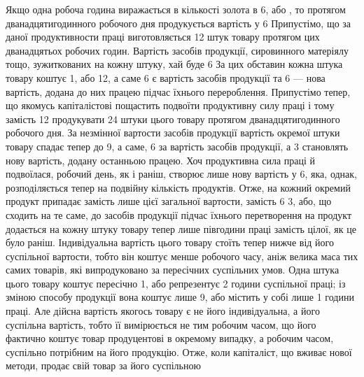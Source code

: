 Якщо одна робоча година виражається в кількості золота
в 6, або , то протягом дванадцятигодинного
робочого дня продукується вартість у 6 Припустімо, що
за даної продуктивности праці виготовляється 12 штук товару
протягом цих дванадцятьох робочих годин. Вартість засобів продукції,
сировинного матеріялу тощо, зужиткованих на кожну
штуку, хай буде 6 За цих обставин кожна штука товару
коштує 1, або 12, а саме 6 є вартість засобів
продукції та 6 — нова вартість, додана до них працею
підчас їхнього перероблення. Припустімо тепер, що якомусь
капіталістові пощастить подвоїти продуктивну силу праці і тому
замість 12 продукувати 24 штуки цього товару протягом дванадцятигодинного
робочого дня. За незмінної вартости засобів
продукції вартість окремої штуки товару спадає тепер до 9,
 а саме, 6 за вартість засобів продукції, а 3 становлять
нову вартість, додану останньою працею. Хоч продуктивна
сила праці й подвоїлася, робочий день, як і раніш, створює
лише нову вартість у 6, яка, однак, розподіляється
тепер на подвійну кількість продуктів. Отже, на кожний окремий
продукт припадає замість  лише  цієї загальної вартости,
замість 6 3, або, що сходить на те саме, до засобів
продукції підчас їхнього перетворення на продукт додається на
кожну штуку товару тепер лише півгодини праці замість цілої,
як це було раніш. Індивідуальна вартість цього товару стоїть
тепер нижче від його суспільної вартости, тобто він коштує менше
робочого часу, аніж велика маса тих самих товарів, які випродуковано
за пересічних суспільних умов. Одна штука цього товару
коштує пересічно 1, або репрезентує 2 години суспільної
праці; із зміною способу продукції вона коштує лише 9,
або містить у собі лише 1 години праці. Але дійсна вартість
якогось товару є не його індивідуальна, а його суспільна вартість,
тобто її вимірюється не тим робочим часом, що його фактично
коштує товар продуцентові в окремому випадку, а робочим часом,
суспільно потрібним на його продукцію. Отже, коли капіталіст,
що вживає нової методи, продає свій товар за його суспільною

\parbreak{}  %
